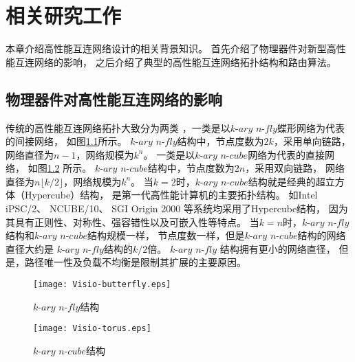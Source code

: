 \chapter{相关研究工作}
本章介绍高性能互连网络设计的相关背景知识。
首先介绍了物理器件对新型高性能互连网络的影响，
之后介绍了典型的高性能互连网络拓扑结构和路由算法。

\section{物理器件对高性能互连网络的影响}
传统的高性能互连网络拓扑大致分为两类
，一类是以$k\textrm{-}ary$ $n\textrm{-}fly$蝶形网络为代表的间接网络，
如图\ref{butterfly}所示。
$k\textrm{-}ary$ $n\textrm{-}fly$结构中，节点度数为$2k$，采用单向链路，
网络直径为$n-1$，网络规模为$k^n$。
一类是以$k\textrm{-}ary$ $n\textrm{-}cube$网络为代表的直接网络，
如图\ref{torus} 所示。
$k\textrm{-}ary$ $n\textrm{-}cube$结构中，节点度数为$2n$，采用双向链路，
网络直径为$n \lfloor k/2 \rfloor$，网络规模为$k^n$。
当$k=2$时，$k\textrm{-}ary$ $n\textrm{-}cube$结构就是经典的超立方体（Hypercube）结构，
是第一代高性能计算机的主要拓扑结构。
如Intel iPSC/2、 NCUBE/10、
SGI Origin 2000 等系统均采用了Hypercube结构，
因为其具有正则性、对称性、强容错性以及可嵌入性等特点。
当$k=n$时，$k\textrm{-}ary$ $n\textrm{-}fly$结构和$k\textrm{-}ary$ $n\textrm{-}cube$结构规模一样，
节点度数一样，但是$k\textrm{-}ary$ $n\textrm{-}cube$结构的网络直径大约是
$k\textrm{-}ary$ $n\textrm{-}fly$结构的$k/2$倍。
$k\textrm{-}ary$ $n\textrm{-}fly$ 结构拥有更小的网络直径，
但是，路径唯一性及负载不均衡是限制其扩展的主要原因。

\begin{figure}[htp]
  \centering
   \texttt{[image: Visio-butterfly.eps]}
    \caption{$k\textrm{-}ary$ $n\textrm{-}fly$结构}
    \label{butterfly}
\end{figure}

\begin{figure}[htp]
  \centering
   \texttt{[image: Visio-torus.eps]}
      \caption{$k\textrm{-}ary$ $n\textrm{-}cube$结构}
      \label{torus}
\end{figure}

